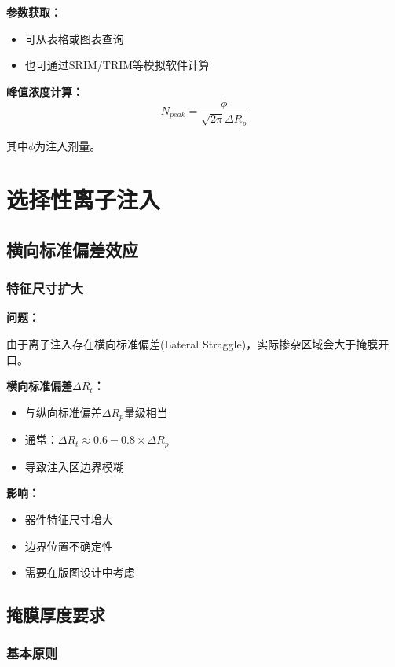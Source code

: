 \documentclass[UTF8,12pt,a4paper]{ctexart}
\begin{document}
\textbf{参数获取：}
\begin{itemize}
    \item 可从表格或图表查询
    \item 也可通过SRIM/TRIM等模拟软件计算
\end{itemize}

\textbf{峰值浓度计算：}
\begin{equation}
N_{peak} = \frac{\phi}{\sqrt{2\pi} \Delta R_p}
\end{equation}

其中$\phi$为注入剂量。

\newpage

\section{选择性离子注入}

\subsection{横向标准偏差效应}

\subsubsection{特征尺寸扩大}

\textbf{问题：}

由于离子注入存在横向标准偏差(Lateral Straggle)，实际掺杂区域会大于掩膜开口。

\textbf{横向标准偏差$\Delta R_t$：}
\begin{itemize}
    \item 与纵向标准偏差$\Delta R_p$量级相当
    \item 通常：$\Delta R_t \approx 0.6 - 0.8 \times \Delta R_p$
    \item 导致注入区边界模糊
\end{itemize}

\textbf{影响：}
\begin{itemize}
    \item 器件特征尺寸增大
    \item 边界位置不确定性
    \item 需要在版图设计中考虑
\end{itemize}

\subsection{掩膜厚度要求}

\subsubsection{基本原则}
\end{document}
